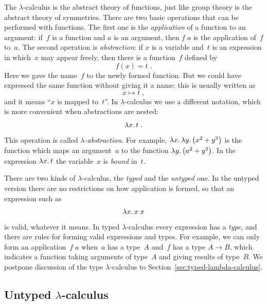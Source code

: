 The $\lambda$-calculus is the abstract theory of functions, just like
group theory is the abstract theory of symmetries. There are two basic
operations that can be performed with functions. The first one is the
\emph{application} of a function to an argument: if~$f$ is a function
and $a$ is an argument, then $f\; a$ is the application of~$f$ to~$a$.
The second operation is \emph{abstraction}: if $x$ is a variable
and~$t$ is an expression in which~$x$ may appear freely, then there is
a function~$f$ defined by
%
\begin{equation*}
  f(x) = t \;.
\end{equation*}
%
Here we gave the name~$f$ to the newly formed function. But we could
have expressed the same function without giving it a name;
this is usually written as
%
\begin{equation*}
  x \mapsto t \;,
\end{equation*}
%
and it means ``$x$ is mapped to~$t$''. In $\lambda$-calculus we use a
different notation, which is more convenient when abstractions are
nested:
%
\begin{equation*}
  \lambda x .\,t \;.
\end{equation*}
%
This operation is called \emph{$\lambda$-abstraction}. For example,
$\lambda x .\,\lambda y .\left(x^2 + y^3\right)$ is the function which maps an
argument~$a$ to the function $\lambda y .\left(a^2 + y^3\right)$. In the expression
$\lambda x .\,t$ the variable~$x$ is \emph{bound} in~$t$.

There are two kinds of $\lambda$-calculus, the \emph{typed} and the
\emph{untyped} one. In the untyped version there are no restrictions
on how application is formed, so that an expression such as
%
\begin{equation*}
  \lambda x .\,x\; x
\end{equation*}
%
is valid, whatever it means. In typed $\lambda$-calculus every
expression has a \emph{type}, and there are rules for forming valid
expressions and types. For example, we can only form an
application~$f\; a$ when~$a$ has a type~$A$ and~$f$ has a type $A \to
B$, which indicates a function taking arguments of type~$A$ and giving
results of type~$B$. We postpone discussion of the type
$\lambda$-calculus to Section~\ref{sec:typed-lambda-calculus}.

\subsection{Untyped $\lambda$-calculus}
\label{sec:untyped-lambda-calculus}

